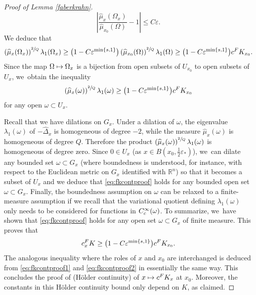 \documentclass[11pt]{article}
\newcommand\mto{\mathchoice{\longmapsto}{\mapsto}{\mapsto}{\mapsto}}
\let\oldsfrac\sfrac
\renewcommand{\sfrac}[2]{{\oldsfrac{#1}{#2}}}
\newcommand{\rc}{\textup{c}}
\newcommand{\FK}{\textup{FK}}
\theoremstyle{definition}
\let\epsilon\varepsilon
\newcommand{\1}{\mathbbm{1}}
\newcommand{\R}{\mathbb{R}}
\numberwithin{equation}{section}
\begin{document}
\begin{proof}[Proof of Lemma \ref{faberkrahn}]
\begin{equation}
\label{eq:fkcontproof2}
\left| \frac{\widehat\mu_x(\Omega_x)}{\widehat\mu_{x_0}(\Omega)} - 1\right| \leq C \epsilon.
\end{equation}
We deduce that
\[
\left(\widehat\mu_x(\Omega_x)\right)^{\sfrac2Q} \lambda_1(\Omega_x)
\geq \bigl(1- C \epsilon^{\min\{s,1\}}\bigr) \left(\widehat\mu_{x_0}(\Omega)\right)^{\sfrac2Q} \lambda_1(\Omega) \geq \bigl(1- C \epsilon^{\min\{s,1\}}\bigr) c^\FK_{x_0}.
\]
Since the map $\Omega\mto\Omega_x$ is a bijection from open subsets of $U_{x_0}$ to open subsets of $U_x$, we~obtain the inequality
\begin{equation}
\label{eq:fkcontproof}
\left(\widehat\mu_x(\omega)\right)^{\sfrac2Q} \lambda_1(\omega)
\geq \bigl(1- C \epsilon^{\min\{s,1\}} \bigr) c^\FK_{x_0}
\end{equation}
for any open $\omega\subset U_x$.

Recall that we have dilations on $G_x$. Under a dilation of $\omega$, the eigenvalue $\lambda_1(\omega)$ of $-\widehat\Delta_x$ is homogeneous of degree $-2$, while the measure $\widehat\mu_x(\omega)$ is homogeneous of degree $Q$. Therefore the product $\left(\widehat\mu_x(\omega)\right)^{\sfrac2Q} \lambda_1(\omega)$ is homogeneous of degree zero. Since $0\in U_x$ (as $x\in B(x_0,\frac12\epsilon_*)$), we~can dilate any bounded set $\omega\subset G_x$ (where boundedness is understood, for instance, with respect to the Euclidean metric on $G_x$ identified with $\R^n$) so that it becomes a subset of $U_x$ and we deduce that \eqref{eq:fkcontproof} holds for any bounded open set $\omega\subset G_x$. Finally, the boundedness assumption on $\omega$ can be relaxed to a finite-measure assumption if we recall that the variational quotient defining $\lambda_1(\omega)$ only needs to be considered for functions in $C^\infty_\rc(\omega)$. To summarize, we~have shown that \eqref{eq:fkcontproof} holds for any open set $\omega\subset G_x$ of finite measure. This proves that
\[
c_x^\FK \geq \bigl(1- C \epsilon^{\min\{s,1\}} \bigr) c^\FK_{x_0}.
\]
The analogous inequality where the roles of $x$ and $x_0$ are interchanged is deduced from \eqref{eq:fkcontproof1} and \eqref{eq:fkcontproof2} in essentially the same way. This concludes the proof of (Hölder continuity) of $x\mto c^\FK_x$ at $x_0$. Moreover, the constants in this Hölder continuity bound only depend on $K$, as claimed.
\end{proof}
\end{document}
